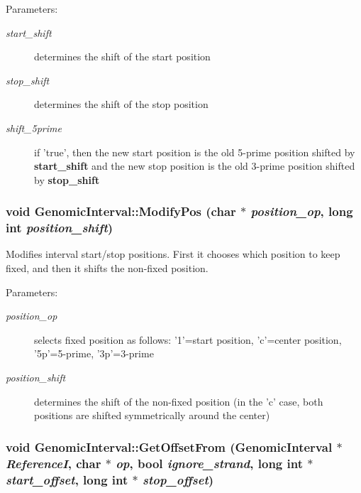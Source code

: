 \begin{Desc}
\item[Parameters:]
\begin{description}
\item[{\em start\_\-shift}]determines the shift of the start position \item[{\em stop\_\-shift}]determines the shift of the stop position \item[{\em shift\_\-5prime}]if 'true', then the new start position is the old 5-prime position shifted by {\bf start\_\-shift} and the new stop position is the old 3-prime position shifted by {\bf stop\_\-shift} \end{description}
\end{Desc}
\hypertarget{classGenomicInterval_96b34b76019001c4751d4c4f868ee24d}{
\subsubsection[ModifyPos]{\setlength{\rightskip}{0pt plus 5cm}void GenomicInterval::ModifyPos (char $\ast$ {\em position\_\-op}, \/  long int {\em position\_\-shift})}}
\label{classGenomicInterval_96b34b76019001c4751d4c4f868ee24d}


Modifies interval start/stop positions. First it chooses which position to keep fixed, and then it shifts the non-fixed position. 

\begin{Desc}
\item[Parameters:]
\begin{description}
\item[{\em position\_\-op}]selects fixed position as follows: '1'=start position, 'c'=center position, '5p'=5-prime, '3p'=3-prime \item[{\em position\_\-shift}]determines the shift of the non-fixed position (in the 'c' case, both positions are shifted symmetrically around the center) \end{description}
\end{Desc}
\hypertarget{classGenomicInterval_ab40ad7dd997948e0c04a13164e955d6}{
\subsubsection[GetOffsetFrom]{\setlength{\rightskip}{0pt plus 5cm}void GenomicInterval::GetOffsetFrom ({\bf GenomicInterval} $\ast$ {\em ReferenceI}, \/  char $\ast$ {\em op}, \/  bool {\em ignore\_\-strand}, \/  long int $\ast$ {\em start\_\-offset}, \/  long int $\ast$ {\em stop\_\-offset})}}
\label{classGenomicInterval_ab40ad7dd997948e0c04a13164e955d6}


